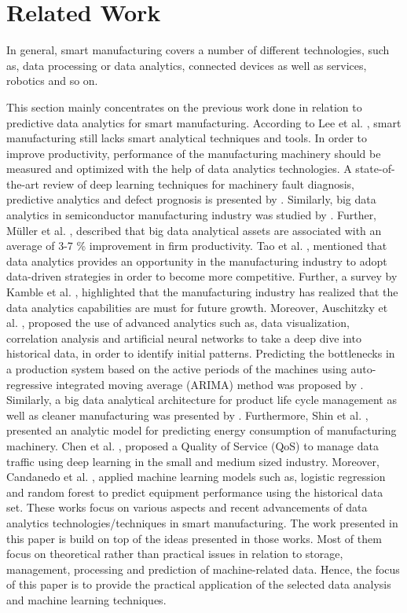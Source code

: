 \documentclass[runningheads]{llncs}
\begin{document}
\fi

\section{Related Work}
\label{sec:relatedwork}
In general, smart manufacturing covers a number of different technologies, such as, data processing or data analytics, connected devices as well as services, robotics and so on. 

This section mainly concentrates on the previous work done in relation to predictive data analytics for smart manufacturing. According to Lee et al. \cite{Lee}, smart manufacturing still lacks smart analytical techniques and tools. In order to improve productivity, performance of the manufacturing machinery should be measured and optimized with the help of data analytics technologies. A state-of-the-art review of deep learning techniques for machinery fault diagnosis, predictive analytics and defect prognosis is presented by \cite{Wang}. Similarly, big data analytics in semiconductor manufacturing industry was studied by \cite{Moyne}. Further, M\"uller et al. \cite{Muller}, described that big data analytical assets are associated with an average of 3-7 \% improvement in firm productivity. Tao et al. \cite{Tao}, mentioned that data analytics provides an opportunity in the manufacturing industry to adopt data-driven strategies in order to become more competitive. Further, a survey by Kamble et al. \cite{Kamble}, highlighted that the manufacturing industry has realized that the data analytics capabilities are must for future growth. Moreover, Auschitzky et al. \cite{Auschitzky}, proposed the use of advanced analytics such as, data visualization, correlation analysis and artificial neural networks to take a deep dive into historical data, in order to identify initial patterns. Predicting the bottlenecks in a production system based on the active periods of the machines using auto-regressive integrated moving average (ARIMA) method was proposed by \cite{Subramaniyan}. Similarly, a big data analytical architecture for product life cycle management as well as cleaner manufacturing was presented by \cite{Zhang}. Furthermore, Shin et al. \cite{Shin}, presented an analytic model for predicting energy consumption of manufacturing machinery. Chen et al. \cite{Chen}, proposed a Quality of Service (QoS) to manage data traffic using deep learning in the small and medium sized industry. Moreover, Candanedo et al. \cite{Candanedo}, applied machine learning models such as, logistic regression and random forest to predict equipment performance using the historical data set. These works focus on various aspects and recent advancements of data analytics technologies/techniques in smart manufacturing. The work presented in this paper is build on top of the ideas presented in those works. Most of them focus on theoretical rather than practical issues in relation to storage, management, processing and prediction of machine-related data. Hence, the focus of this paper is to provide the practical application of the selected data analysis and machine learning techniques.
\end{document}
